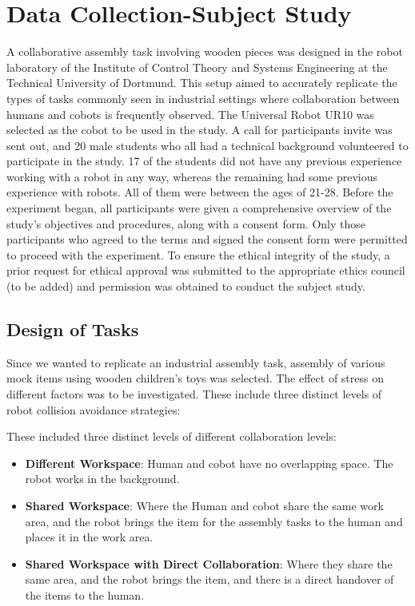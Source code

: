 \chapter{Data Collection-Subject Study}

A collaborative assembly task involving wooden pieces was designed in the robot laboratory of the Institute of Control Theory and Systems Engineering at the Technical University of Dortmund. This setup aimed to accurately replicate the types of tasks commonly seen in industrial settings where collaboration between humans and cobots is frequently observed. The Universal Robot UR10 was selected as the cobot to be used in the study. A call for participants invite was sent out, and 20 male students who all had a technical background volunteered to participate in the study. 17 of the students did not have any previous experience working with a robot in any way, whereas the remaining
had some previous experience with robots. All of them were between the ages of 21-28. Before the experiment began, all participants were given a comprehensive overview of the study's objectives and procedures, along with a consent form. Only those participants who agreed to the terms and signed the consent form were permitted to proceed with the experiment. To ensure the ethical integrity of the study, a prior request for ethical approval was submitted to the appropriate ethics council (to be added) and permission was obtained to conduct the subject study.

\section{Design of Tasks}
Since we wanted to replicate an industrial assembly task, assembly of various mock items using wooden children's toys was selected. The effect of stress on different factors was to be investigated. These include three distinct levels of robot collision avoidance strategies:

These included three distinct levels of different collaboration levels:

\begin{itemize}
    \item \textbf{Different Workspace}:
    Human and cobot have no overlapping space. The robot works in the background.
    
    \item \textbf{Shared Workspace}:
    Where the Human and cobot share the same work area, and the robot brings the item for the assembly tasks to the human and places it in the work area.
    
    \item \textbf{Shared Workspace with Direct Collaboration}:
    Where they share the same area, and the robot brings the item, and there is a direct handover of the items to the human.
\end{itemize}

